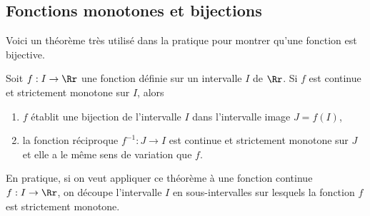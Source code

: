 \documentclass[class=report,crop=false]{standalone}
\begin{document}
\subsection{Fonctions monotones et bijections}


Voici un théorème très utilisé dans la pratique pour montrer qu'une fonction est bijective.

\begin{theoreme}
Soit $f:I\to \Rr$ une fonction définie sur un intervalle $I$ de $\Rr$. Si $f$ est continue
et strictement monotone sur $I$, alors
\begin{enumerate}
\item $f$ établit une bijection de l'intervalle $I$ dans l'intervalle image $J=f(I)$,
\item la fonction réciproque $f^{-1}:J\to I$ est continue et strictement monotone
sur $J$ et elle a le même sens de variation que $f$.
\end{enumerate}
\end{theoreme}


En pratique, si on veut appliquer ce théorème à une fonction continue $f:I\to \Rr$,
on découpe l'intervalle $I$ en sous-intervalles sur lesquels la fonction $f$ est strictement monotone.
\end{document}
